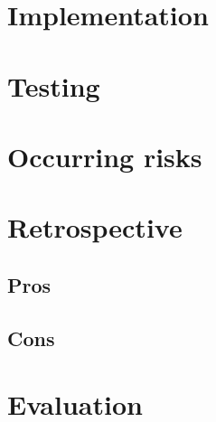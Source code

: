 \section{Implementation}
\section{Testing}
\section{Occurring risks}
\section{Retrospective}
\subsection{Pros}
\subsection{Cons}
\section{Evaluation}